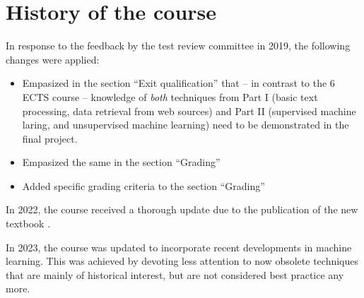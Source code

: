 \documentclass[a4paper,12pt]{report}
\begin{document}
\chapter{History of the course}
In response to the feedback by the test review committee in 2019, the following changes were applied:
\begin{itemize}
\item Empasized in the section ``Exit qualification'' that -- in contrast to the 6 ECTS course -- knowledge of \emph{both} techniques from Part I (basic text processing, data retrieval from web sources) and Part II (supervised machine laring, and unsupervised machine learning) need to be demonstrated in the final project.
\item Empasized the same in the section ``Grading''
\item Added specific grading criteria to the section ``Grading''
\end{itemize}

In 2022, the course received a thorough update due to the publication of the new textbook \citep{cssbook}.

In 2023, the course was updated to incorporate recent developments in machine learning. This was achieved by devoting less attention to now obsolete techniques that are mainly of historical interest, but are not considered best practice any more.




 
 
 
\end{document}
